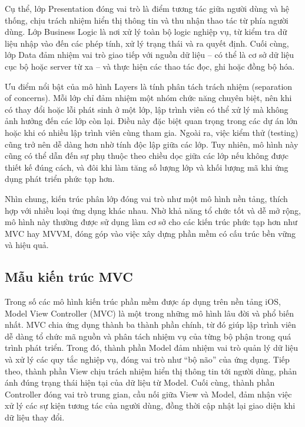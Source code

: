     
        \hspace*{0.8cm}Cụ thể, lớp Presentation đóng vai trò là điểm tương tác giữa người dùng và hệ thống, chịu trách nhiệm hiển thị thông tin và thu nhận thao tác từ phía người dùng. Lớp Business Logic là nơi xử lý toàn bộ logic nghiệp vụ, từ kiểm tra dữ liệu nhập vào đến các phép tính, xử lý trạng thái và ra quyết định. Cuối cùng, lớp Data đảm nhiệm vai trò giao tiếp với nguồn dữ liệu – có thể là cơ sở dữ liệu cục bộ hoặc server từ xa – và thực hiện các thao tác đọc, ghi hoặc đồng bộ hóa.
    
    
        \vspace{0.5em}
    
        \hspace*{0.8cm}Ưu điểm nổi bật của mô hình Layers là tính phân tách trách nhiệm (separation of concerns). Mỗi lớp chỉ đảm nhiệm một nhóm chức năng chuyên biệt, nên khi có thay đổi hoặc lỗi phát sinh ở một lớp, lập trình viên có thể xử lý mà không ảnh hưởng đến các lớp còn lại. Điều này đặc biệt quan trọng trong các dự án lớn hoặc khi có nhiều lập trình viên cùng tham gia. Ngoài ra, việc kiểm thử (testing) cũng trở nên dễ dàng hơn nhờ tính độc lập giữa các lớp. Tuy nhiên, mô hình này cũng có thể dẫn đến sự phụ thuộc theo chiều dọc giữa các lớp nếu không được thiết kế đúng cách, và đôi khi làm tăng số lượng lớp và khối lượng mã khi ứng dụng phát triển phức tạp hơn.
    
        \vspace{0.5em}
    
        \hspace*{0.8cm}Nhìn chung, kiến trúc phân lớp đóng vai trò như một mô hình nền tảng, thích hợp với nhiều loại ứng dụng khác nhau. Nhờ khả năng tổ chức tốt và dễ mở rộng, mô hình này thường được sử dụng làm cơ sở cho các kiến trúc phức tạp hơn như MVC hay MVVM, đóng góp vào việc xây dựng phần mềm có cấu trúc bền vững và hiệu quả.
    

\subsection{Mẫu kiến trúc MVC}
\renewcommand{\labelitemi}{--}    
    
        \hspace*{0.8cm}Trong số các mô hình kiến trúc phần mềm được áp dụng trên nền tảng iOS, Model View Controller (MVC) là một trong những mô hình lâu đời và phổ biến nhất. MVC chia ứng dụng thành ba thành phần chính, từ đó giúp lập trình viên dễ dàng tổ chức mã nguồn và phân tách nhiệm vụ của từng bộ phận trong quá trình phát triển. Trong đó, thành phần Model đảm nhiệm vai trò quản lý dữ liệu và xử lý các quy tắc nghiệp vụ, đóng vai trò như “bộ não” của ứng dụng. Tiếp theo, thành phần View chịu trách nhiệm hiển thị thông tin tới người dùng, phản ánh đúng trạng thái hiện tại của dữ liệu từ Model. Cuối cùng, thành phần Controller đóng vai trò trung gian, cầu nối giữa View và Model, đảm nhận việc xử lý các sự kiện tương tác của người dùng, đồng thời cập nhật lại giao diện khi dữ liệu thay đổi.
    

